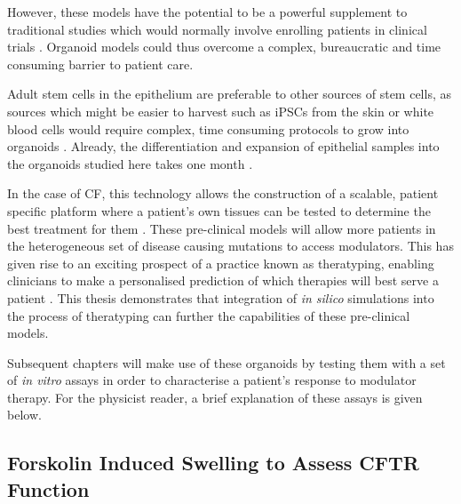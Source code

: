 However, these models have the potential to be a powerful supplement to traditional studies which would normally involve enrolling patients in clinical trials \cite{pranke2019a}. Organoid models could thus overcome a complex, bureaucratic and time consuming barrier to patient care.

Adult stem cells in the epithelium are preferable to other sources of stem cells, as sources which might be easier to harvest such as iPSCs from the skin or white blood cells would require complex, time consuming protocols to grow into organoids \cite{wong2012}. Already, the differentiation and expansion of epithelial samples into the organoids studied here takes one month \cite{sato2011}.

In the case of CF, this technology allows the construction of a scalable, patient specific platform where a patient's own tissues can be tested to determine the best treatment for them \cite{keegan2021, sato2011}. These pre-clinical models will allow more patients in the heterogeneous set of disease causing mutations to access modulators. This has given rise to an exciting prospect of a practice known as theratyping, enabling clinicians to make a personalised prediction of which therapies will best serve a patient \cite{clancy2019, wong2022, wong2022a, ciciriello2022}. This thesis demonstrates that integration of \textit{in silico} simulations into the process of theratyping can further the capabilities of these pre-clinical models.

Subsequent chapters will make use of these organoids by testing them with a set of \textit{in vitro} assays in order to characterise a patient's response to modulator therapy. For the physicist reader, a brief explanation of these assays is given below.

\subsection{Forskolin Induced Swelling to Assess CFTR Function}

